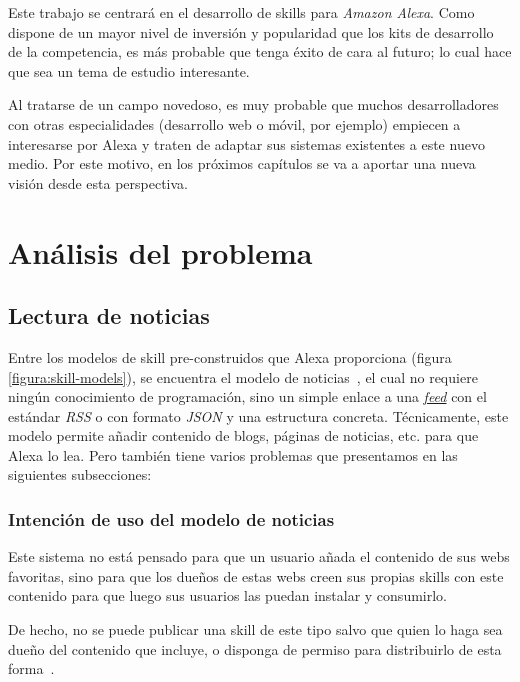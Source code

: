 \documentclass[11pt,spanish,listoffigures,listoftables,table,hyphens,dvipsnames]{tfgetsinf}
\begin{document}
Este trabajo se centrará en el desarrollo de skills para \emph{Amazon Alexa}. Como dispone de un mayor nivel de inversión y popularidad que los kits de desarrollo de la competencia, es más probable que tenga éxito de cara al futuro; lo cual hace que sea un tema de estudio interesante.

Al tratarse de un campo novedoso, es muy probable que muchos desarrolladores con otras especialidades (desarrollo web o móvil, por ejemplo) empiecen a interesarse por Alexa y traten de adaptar sus sistemas existentes a este nuevo medio. Por este motivo, en los próximos capítulos se va a aportar una nueva visión desde esta perspectiva.


\chapter{Análisis del problema}
\label{capitulo:analisis-problema}

\section{Lectura de noticias}

Entre los modelos de skill pre-construidos que Alexa proporciona (figura \ref{figura:skill-models}), se encuentra el modelo de noticias~\cite{flash-briefing-skills-doc}, el cual no requiere ningún conocimiento de programación, sino un simple enlace a una \hyperref[glosario:feed]{\emph{feed}} con el estándar \emph{RSS} o con formato \emph{JSON} y una estructura concreta. Técnicamente, este modelo permite añadir contenido de blogs, páginas de noticias, etc. para que Alexa lo lea. Pero también tiene varios problemas que presentamos en las siguientes subsecciones:

\subsection{Intención de uso del modelo de noticias}

Este sistema no está pensado para que un usuario añada el contenido de sus webs favoritas, sino para que los dueños de estas webs creen sus propias skills con este contenido para que luego sus usuarios las puedan instalar y consumirlo.

De hecho, no se puede publicar una skill de este tipo salvo que quien lo haga sea dueño del contenido que incluye, o disponga de permiso para distribuirlo de esta forma~\cite{flash-briefing-skill-policy-guidelines}.
\end{document}
